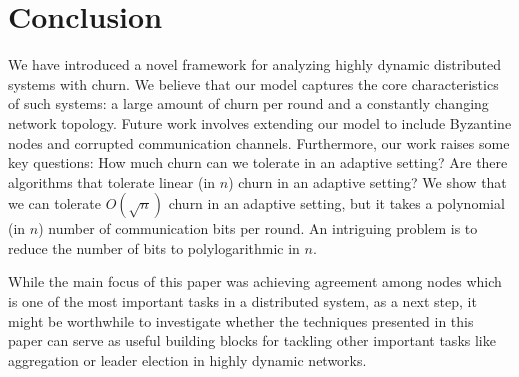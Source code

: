 \documentclass[leqno,11pt]{article}
\begin{document}
\section{Conclusion}
We have introduced a novel framework for analyzing highly dynamic
distributed systems with churn. We believe that our model
captures the core characteristics of such systems: a large amount of churn
per round and a constantly changing network topology.  Future work  involves extending our model to include Byzantine nodes and corrupted
communication channels. Furthermore, our work raises some key questions:
How much churn can we tolerate in an adaptive setting? Are there algorithms that
tolerate linear (in $n$) churn in an adaptive setting? We show that we can tolerate $O(\sqrt{n})$ 
churn in an adaptive setting, but it takes a polynomial (in $n$) number of communication bits per round.
An intriguing problem is to reduce the number of bits to polylogarithmic in $n$.

While the main focus of this paper was achieving agreement among nodes
which is one of the most important tasks in a distributed system, as a next step, it might be worthwhile to investigate whether the techniques presented in this paper can serve  as useful building blocks for tackling other important tasks
like aggregation or leader election in highly dynamic networks.



\end{document}
